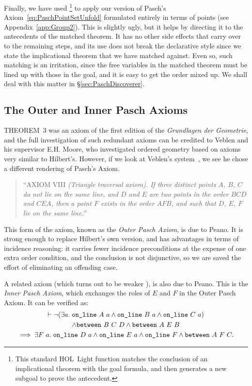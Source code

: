 Finally, we have used \footnote{This standard HOL~Light function matches the conclusion of an implicational theorem with the goal formula, and then generates a new subgoal to prove the antecedent.} to apply our version of Pasch's Axiom~\eqref{eq:PaschPointSetUnfold} formulated entirely in terms of points (see Appendix~\ref{app:Group2}). This is slightly ugly, but it helps  by directing it to the antecedents of the matched theorem. It has no other side effects that carry over to the remaining steps, and its use does not break the declarative style since we state the implicational theorem that we have matched against. Even so, such matching is an irritation, since the free variables in the matched theorem must be lined up with those in the goal, and it is easy to get the order mixed up. We shall deal with this matter in \S\ref{sec:PaschDiscoverer}.

\subsection{The Outer and Inner Pasch Axioms}
THEOREM~3 was an axiom of the first edition of the \emph{Grundlagen der Geometrie}, and the full investigation of such redundant axioms can be credited to Veblen and his supervisor E.H. Moore, who investigated ordered geometry based on axioms very similar to Hilbert's. However, if we look at Veblen's system~\cite{Veblenphd}, we see he chose a different rendering of Pasch's Axiom.

\begin{quotation}
``AXIOM VIII \emph{(Triangle traversal axiom). If three distinct points $A$, $B$, $C$ do not lie on the same line, and $D$ and $E$ are two points in the order $BCD$ and $CEA$, then a point $F$ exists in the order $AFB$, and such that $D$, $E$, $F$ lie on the same line.}''
\end{quotation}

This form of the axiom, known as the \emph{Outer Pasch Axiom}, is due to Peano. It is strong enough to replace Hilbert's own version, and has advantages in terms of incidence reasoning: it carries fewer incidence preconditions at the expense of one extra order condition, and the conclusion is not disjunctive, so we are saved the effort of eliminating an offending case.

A related axiom (which turns out to be weaker \cite{PaschForms}), is also due to Peano. This is the \emph{Inner Pasch Axiom}, which exchanges the roles of $E$ and $F$ in the Outer Pasch Axiom. It can be verified as:
\begin{multline}\label{eq:InnerPaschWeak}
  \vdash\Triangle{a}{A}{B}{C} \\
\wedge \between{B}{C}{D} \wedge \between{A}{E}{B}\\ 
\implies \exists F\ a.\;  \code{on\_line}\ D\ a \wedge \code{on\_line}\ E\ a \wedge \code{on\_line}\ F \wedge \between{A}{F}{C}.
\end{multline}

